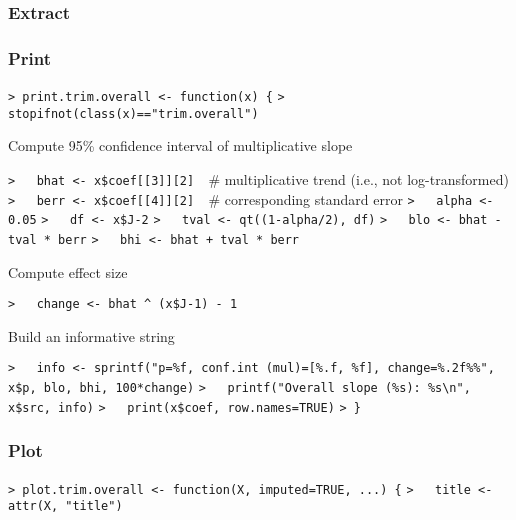 \documentclass[a4paper]{article}
\begin{document}
\subsubsection{Extract}\par




\subsubsection{Print}\par

\verb~> print.trim.overall <- function(x) {~\newline
\verb~>   stopifnot(class(x)=="trim.overall")~\par

Compute 95\% confidence interval of multiplicative slope\par
\verb~>   bhat <- x$coef[[3]][2]  ~{\sffamily\# multiplicative trend (i.e., not log-transformed)}\newline
\verb~>   berr <- x$coef[[4]][2]  ~{\sffamily\# corresponding standard error}\newline
\verb~>   alpha <- 0.05~\newline
\verb~>   df <- x$J-2~\newline
\verb~>   tval <- qt((1-alpha/2), df)~\newline
\verb~>   blo <- bhat - tval * berr~\newline
\verb~>   bhi <- bhat + tval * berr~\par
Compute effect size\par
\verb~>   change <- bhat ^ (x$J-1) - 1~\par
Build an informative string\par
\verb~>   info <- sprintf("p=%f, conf.int (mul)=[%.f, %f], change=%.2f%%", x$p, blo, bhi, 100*change)~\newline
\verb~>   printf("Overall slope (%s): %s\n", x$src, info)~\newline
\verb~>   print(x$coef, row.names=TRUE)~\newline
\verb~> }~\par



\subsubsection{Plot}\par

\verb~> plot.trim.overall <- function(X, imputed=TRUE, ...) {~\newline
\verb~>   title <- attr(X, "title")~\par
\end{document}
